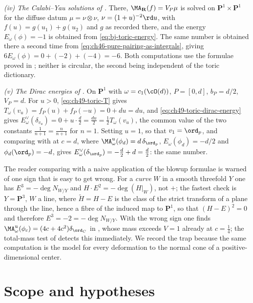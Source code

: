 \begin{example}
\emph{(iv) The Calabi--Yau solutions of .}  There,
$\MA_{\mathbf R}(f)=V_P\mu$ is solved on
$\mathbf P^1\times\mathbf P^1$ for the diffuse datum
$\mu=\nu\otimes\nu$, $\nu=(1+u)^{-2}\rd u$, with
$f(u)=g(u_1)+g(u_2)$ and $g$ as recorded there, and the energy
$E_\omega(\phi)=-1$ is obtained from \eqref{eq:bj-toric-energy}.  The
same number is obtained there a second time from
\eqref{eq:ch46-pure-pairing-as-integrals}, giving
$6E_\omega(\phi)=0+(-2)+(-4)=-6$.  Both computations use the formulae
proved in ; neither is circular, the second being
independent of the toric dictionary.

\emph{(v) The Dirac energies of .}  On
$\mathbf P^1$ with $\omega=c_1(\cO(d))$, $P=[0,d]$,
$b_P=d/2$, $V_P=d$.  For $u>0$, \eqref{eq:ch49-toric-T} gives
$T_\omega(v_u)=f_P(u)+f_P(-u)=0+du=du$, and
\eqref{eq:ch49-toric-dirac-energy} gives
$E^\vee_\omega(\delta_{v_u})=0+u\cdot\tfrac d2=\tfrac{du}{2}
=\tfrac12T_\omega(v_u)$, the common value of the two constants
$\tfrac1{n+1}=\tfrac n{n+1}$ for $n=1$.  Setting $u=1$, so that
$v_1=\ord_p$, and comparing with  at $c=d$,
where $\MA^{\mathrm u}_\omega(\phi_d)=d\,\delta_{\ord_p}$,
$E_\omega(\phi_d)=-d/2$ and $\phi_d(\ord_p)=-d$, gives
$E^\vee_\omega(\delta_{\ord_p})=-\tfrac d2+d=\tfrac d2$: the same
number.
\end{example}

\begin{remark}
\label{rem:ch49-draft-correction}
The reader comparing  with a naive application of the
blowup formulae is warned of one sign that is easy to get wrong.  For a
\emph{curve} $W$ in a smooth threefold $Y$ one has
$E^3=-\deg N_{W/Y}$ and $H\cdot E^2=-\deg(H|_W)$, not $+$; the fastest
check is $Y=\mathbf P^3$, $W$ a line, where
$\widetilde H=H-E$ is the class of the strict transform of a plane
through the line, hence a fibre of the induced map to $\mathbf P^1$, so
that $(H-E)^2=0$ and therefore $E^3=-2=-\deg N_{W/Y}$.  With the wrong
sign one finds $\MA^{\mathrm u}_\omega(\phi_c)=(4c+4c^2)\delta_{\ord_C}$
in , whose mass exceeds $V=1$ already at
$c=\tfrac14$; the total-mass test of  detects
this immediately.  We record the trap because the same computation is the
model for every deformation to the normal cone of a positive-dimensional
center.
\end{remark}

\section{Scope and hypotheses}
\label{sec:ch49-scope}

